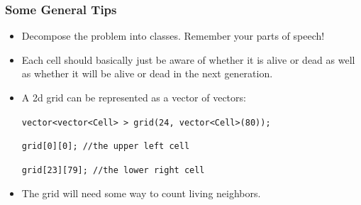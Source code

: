 \documentclass{beamer}
\begin{document}
\begin{frame}
    \frametitle{Some General Tips}
    \begin{itemize}
        \item Decompose the problem into classes.  Remember your parts of 
            speech!
        \item Each cell should basically just be aware of whether it is 
            alive or dead as well as whether it will be alive or dead in
            the next generation.
        \item A 2d grid can be represented as a vector of vectors:
            \par{\tt vector<vector<Cell> > grid(24, vector<Cell>(80));}
            \par{\tt grid[0][0];   //the upper left cell}
            \par{\tt grid[23][79]; //the lower right cell}
        \item The grid will need some way to count living neighbors.
    \end{itemize}
\end{frame}
\end{document}
